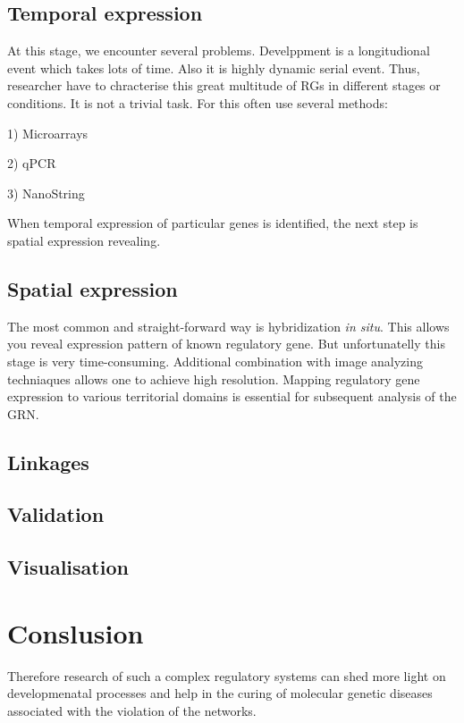 \documentclass[a4paper, oneside]{report}
\begin{document}
\subsection*{Temporal expression}

At this stage, we encounter several problems.
Develppment is a longitudional event which takes lots of time.
Also it is highly dynamic serial event.
Thus, researcher have to chracterise this great multitude of RGs in different stages or conditions.
It is not a trivial task.
For this often use several methods:

\vspace{2mm}

1) Microarrays

2) qPCR 

3) NanoString 

\vspace{2mm}

When temporal expression of particular genes is identified, the next step is spatial expression revealing.

\subsection*{Spatial expression}

The most common and straight-forward way is hybridization \textit{in situ}.
This allows you reveal expression pattern of known regulatory gene.  
But unfortunatelly this stage is very time-consuming.
Additional combination with image analyzing techniaques allows one to achieve high resolution.
Mapping regulatory gene expression to various territorial domains is essential for subsequent analysis of the GRN.

\subsection*{Linkages}

\subsection*{Validation}

\subsection*{Visualisation}

\section*{Conslusion}


Therefore research of such a complex regulatory systems can shed more light on developmenatal processes and help in the curing of molecular genetic diseases associated with the violation of the networks.



\end{document}
